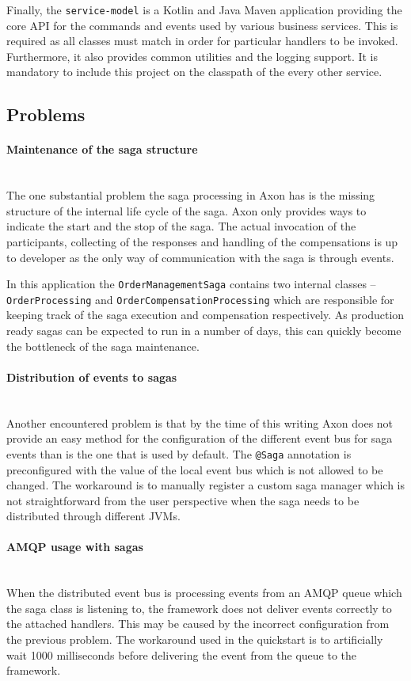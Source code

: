 \documentclass[oneside,
  digital, %
  table,   %
  nolof,     %
  nolot,     %
]{fithesis3}
\newcommand{\newlinepar}[1]{\paragraph{#1}\needspace{4\baselineskip}\mbox{}\\}
\begin{document}
Finally, the \texttt{service-model} is a Kotlin and Java Maven application providing the core API for the commands and events used by various business services. This is required as all classes must match in order for particular handlers to be invoked. Furthermore, it also provides common utilities and the logging support. It is mandatory to include this project on the classpath of the every other service.

\subsection{Problems}

\newlinepar{Maintenance of the saga structure}

The one substantial problem the saga processing in Axon has is the missing structure of the internal life cycle of the saga. Axon only provides ways to indicate the start and the stop of the saga. The actual invocation of the participants, collecting of the responses and handling of the compensations is up to developer as the only way of communication with the saga is through events.

In this application the \texttt{OrderManagementSaga} contains two internal classes -- \texttt{OrderProcessing} and \texttt{OrderCompensationProcessing} which are responsible for keeping track of the saga execution and compensation respectively. As production ready sagas can be expected to run in a number of days, this can quickly become the bottleneck of the saga maintenance.

\newlinepar{Distribution of events to sagas}

Another encountered problem is that by the time of this writing Axon does not provide an easy method for the configuration of the different event bus for saga events than is the one that is used by default. The \texttt{@Saga} annotation is preconfigured with the value of the local event bus which is not allowed to be changed. The workaround is to manually register a custom saga manager which is not straightforward from the user perspective when the saga needs to be distributed through different JVMs.

\newlinepar{AMQP usage with sagas}

When the distributed event bus is processing events from an AMQP queue which the saga class is listening to, the framework does not deliver events correctly to the attached handlers. This may be caused by the incorrect configuration from the previous problem. The workaround used in the quickstart is to artificially wait 1000 milliseconds before delivering the event from the queue to the framework.
\end{document}
